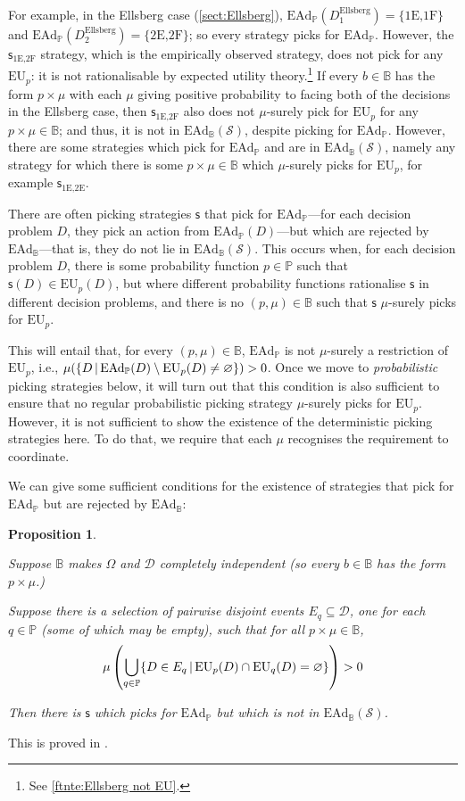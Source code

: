 \documentclass[a4paper,final]{article}
\newtheorem{proposition}[theorem]{Proposition}
\renewcommand\P{\mathbb{P}} %
\newcommand\EU{\mathrm{EU}}
\newcommand\EAd{\mathrm{EAd}}
\newcommand{\Decs}{\mathcal{D}}
\renewcommand\S{\mathcal{S}}
\newcommand\s{\mathsf{s}}
\newcommand{\IB}{\mathbb{B}}
\newcommand{\IP}{\P}
\renewcommand{\color}[1]{}
\newenvironment{colored}[1]{\leavevmode\color{#1}}{}
\newcommand{\Strategies}{\S}
\newcommand\SetDelimiter[1][]{
	\nonscript\,#1\vert \allowbreak \nonscript\,\mathopen{}}
\providecommand\given{\SetDelimiter}
\renewcommand{\emptyset}{\varnothing}
\newenvironment{CCM rewritten}
{\begingroup\color{blue}} %
{\endgroup}              %
\begin{document}
For example, in the Ellsberg case (\cref{sect:Ellsberg}), $\EAd_\IP(D^{\mathrm{Ellsberg}}_1)=\{\text{1E,1F}\}$ and $\EAd_\IP(D^{\mathrm{Ellsberg}}_2)=\{\text{2E,2F}\}$; so every strategy picks for $\EAd_\IP$. 
However, the $\s_{\text{1E,2F}}$ strategy, which is the empirically observed strategy, does not pick for any $\EU_p$: it is not rationalisable by expected utility theory.\footnote{See \cref{ftnte:Ellsberg not EU}.} 
If every $b\in\IB$ has the form $p\times\mu$ with each $\mu$ giving positive probability to facing both of the decisions in the Ellsberg case, then $\s_{\text{1E,2F}}$ also does not $\mu$-surely pick for $\EU_p$ for any $p\times\mu\in\IB$; and thus, it is not in $\EAd_\IB(\S)$, despite picking for $\EAd_\IP$. 
However, there are some strategies which pick for $\EAd_\IP$ and are in $\EAd_\IB(\S)$, namely any strategy for which there is some $p\times\mu\in\IB$ which $\mu$-surely picks for $\EU_p$, for example $\s_{\text{1E,2E}}$. 


	
There are often picking strategies $\s$ that pick for $\EAd_\IP$---for each decision problem $D$, they pick an action from $\EAd_\IP(D)$---but which are rejected by $\EAd_\IB$---that is, they do not lie in $\EAd_\IB(\Strategies)$. 
This occurs when, for each decision problem $D$, there is some probability function $p\in\IP$ such that $\s(D)\in\EU_p(D)$, but where different probability functions rationalise $\s$ in different decision problems, and there is no $(p,\mu)\in\IB$ such that $\s$ $\mu$-surely picks for $\EU_p$. 

This will entail that, for every $(p,\mu)\in\IB$, $\EAd_\IP$ is not $\mu$-surely a restriction of $\EU_p$, i.e., $\mu(\{D\given \EAd_\IP(D)\setminus\EU_p(D)\neq\emptyset\})>0$. Once we move to \emph{probabilistic} picking strategies below, it will turn out that this condition is also sufficient to ensure that no regular probabilistic picking strategy $\mu$-surely picks for $\EU_p$. However, it is not sufficient to show the existence of the deterministic picking strategies here. To do that, we require that each $\mu$ recognises the requirement to coordinate. 

We can give some sufficient conditions for the existence of strategies that pick for $\EAd_\IP$ but are rejected by $\EAd_\IB$: 
\begin{proposition}\label{thm:ead-existsimpermissible[indep]}

Suppose $\IB$ makes $\Omega$ and $\Decs$ completely independent (so every $b\in\IB$ has the form $p\times\mu$.)

Suppose there is a selection of pairwise disjoint events $E_q\subseteq\Decs$, one for each $q\in\IP$ (some of which may be empty), such that for all $p\times\mu\in\IB$, 
\[
\mu\left(\bigcup_{q\in\IP}\{D\in E_q\given \EU_p(D)\cap\EU_q(D)=\emptyset\}\right)>0
\]

Then there is $\s$ which picks for $\EAd_\IP$ but which is not in $\EAd_\IB(\S)$. 
\end{proposition}
This is proved in .
\end{document}
